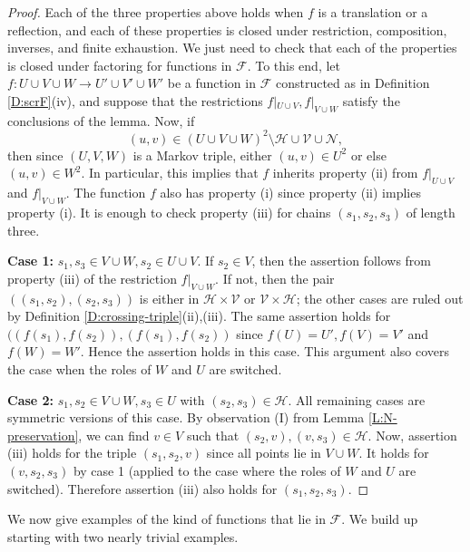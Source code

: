 \documentclass[aop, preprint]{imsart}
\theoremstyle{plain}
\theoremstyle{definition}
\theoremstyle{plain}
\newcommand{\scrV}{\mathcal{V}}
\newcommand{\scrH}{\mathcal{H}}
\newcommand{\scrN}{\mathcal{N}}
\newcommand{\scrF}{\mathcal{F}}
\newcommand{\X}{\times}
\newcommand{\smin}{\setminus}
\begin{document}
\begin{proof}
	Each of the three properties above holds when $f$ is a translation or a reflection, and each of these properties is closed under restriction, composition, inverses, and finite exhaustion. We just need to check that each of the properties is closed under factoring for functions in $\scrF$. To this end, let $f:U \cup V \cup W \to U' \cup V' \cup W'$ be a function in $\scrF$ constructed as in Definition \ref{D:scrF}(iv), and suppose that the restrictions $f|_{U \cup V}, f|_{V \cup W}$ satisfy the conclusions of the lemma. Now, if 
	$$
	(u, v) \in (U \cup V \cup W)^2 \smin \scrH \cup \scrV \cup \scrN,
	$$
	then since $(U, V, W)$ is a Markov triple, either $(u, v) \in U^2$ or else $(u, v) \in W^2$. In particular, this implies that $f$ inherits property (ii) from $f|_{U \cup V}$ and $f|_{V \cup W}$. The function $f$ also has property (i) since property (ii) implies property (i).
	It is enough to check property (iii) for chains $(s_1, s_2, s_3)$ of length three. 
	
	\textbf{Case 1:} $s_1, s_3 \in V \cup W, s_2 \in U \cup V$. \qquad  If $s_2 \in V$, then the assertion follows from property (iii) of the restriction $f|_{V \cup W}$. If not, then the pair $((s_1, s_2), (s_2, s_3))$ is either in $\scrH \X \scrV$ or $\scrV \X \scrH$; the other cases are ruled out by Definition \ref{D:crossing-triple}(ii),(iii). The same assertion holds for $((f(s_1), f(s_2)), (f(s_1), f(s_2))$ since $f(U) = U', f(V) = V'$ and $f(W) = W'$. Hence the assertion holds in this case. This argument also covers the case when the roles of $W$ and $U$ are switched.
	
	\textbf{Case 2:} $s_1, s_2 \in V \cup W, s_3 \in U$ with $(s_2, s_3) \in \scrH$. \qquad All remaining cases are symmetric versions of this case. By observation (I) from Lemma \ref{L:N-preservation}, we can find $v \in V$ such that $(s_2, v), (v, s_3) \in \scrH$. Now, assertion (iii) holds for the triple $(s_1, s_2, v)$ since all points lie in $V \cup W$. It holds for $(v, s_2, s_3)$ by case 1 (applied to the case where the roles of $W$ and $U$ are switched). Therefore assertion (iii) also holds for $(s_1, s_2, s_3)$.
\end{proof}

We now give examples of the kind of functions that lie in $\scrF$. We build up starting with two nearly trivial examples.
\end{document}
